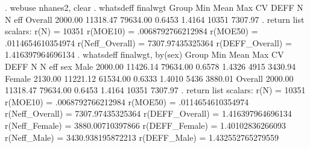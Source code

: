 {\smallskip}
. webuse nhanes2, clear
{\smallskip}
. whatsdeff finalwgt
{\smallskip}
    Group     {\VBAR}   Min     {\VBAR}   Mean    {\VBAR}   Max     {\VBAR}    CV   {\VBAR}   DEFF  {\VBAR}   N   {\VBAR}  N eff
      Overall {\VBAR}   2000.00 {\VBAR}  11318.47 {\VBAR}  79634.00 {\VBAR}  0.6453 {\VBAR}  1.4164 {\VBAR} 10351 {\VBAR} 7307.97
{\smallskip}
. return list
{\smallskip}
scalars:
                  r(N) =  10351
              r(MOE10) =  .0068792766212984
              r(MOE50) =  .0114654610354974
       r(Neff_Overall) =  7307.97435325364
       r(DEFF_Overall) =  1.416397964696134
{\smallskip}
. whatsdeff finalwgt, by(sex)
{\smallskip}
    Group     {\VBAR}   Min     {\VBAR}   Mean    {\VBAR}   Max     {\VBAR}    CV   {\VBAR}   DEFF  {\VBAR}   N   {\VBAR}  N eff
sex           {\VBAR}           {\VBAR}           {\VBAR}           {\VBAR}         {\VBAR}         {\VBAR}       {\VBAR}
         Male {\VBAR}   2000.00 {\VBAR}  11426.14 {\VBAR}  79634.00 {\VBAR}  0.6578 {\VBAR}  1.4326 {\VBAR}  4915 {\VBAR} 3430.94
       Female {\VBAR}   2130.00 {\VBAR}  11221.12 {\VBAR}  61534.00 {\VBAR}  0.6333 {\VBAR}  1.4010 {\VBAR}  5436 {\VBAR} 3880.01
      Overall {\VBAR}   2000.00 {\VBAR}  11318.47 {\VBAR}  79634.00 {\VBAR}  0.6453 {\VBAR}  1.4164 {\VBAR} 10351 {\VBAR} 7307.97
{\smallskip}
. return list
{\smallskip}
scalars:
                  r(N) =  10351
              r(MOE10) =  .0068792766212984
              r(MOE50) =  .0114654610354974
       r(Neff_Overall) =  7307.97435325364
       r(DEFF_Overall) =  1.416397964696134
        r(Neff_Female) =  3880.00710397866
        r(DEFF_Female) =  1.40102836266093
          r(Neff_Male) =  3430.938195872213
          r(DEFF_Male) =  1.432552765279559
